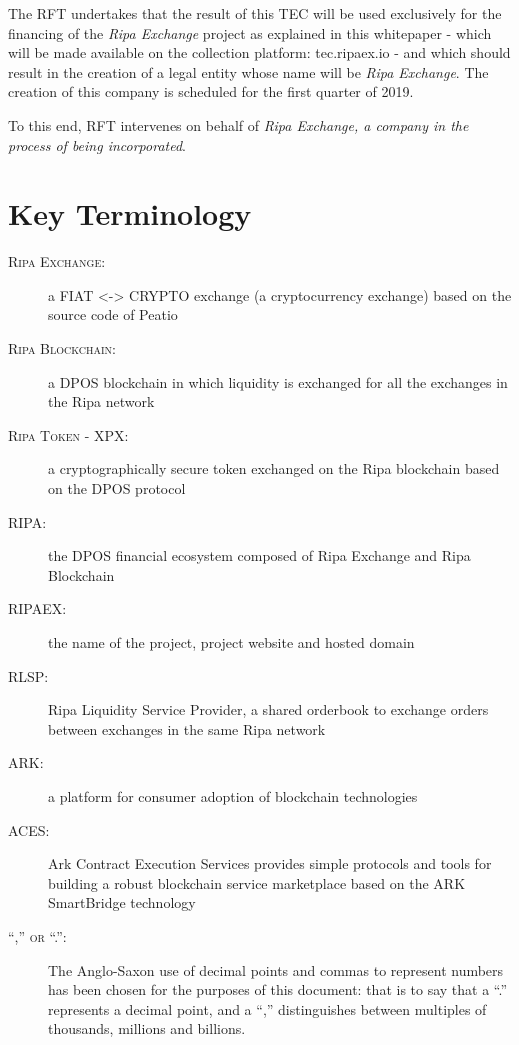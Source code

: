 \documentclass[11pt,fleqn,oneside]{book} %
\begin{document}
The RFT undertakes that the result of this TEC will be used exclusively for the financing of the \emph{Ripa Exchange} project as explained in this 
whitepaper - which will be made available on the collection platform: tec.ripaex.io - and which should result in the creation of a 
legal entity whose name will be \emph{Ripa Exchange}. The creation of this company is scheduled for the first quarter of 2019.

To this end, RFT intervenes on behalf of \emph{Ripa Exchange, a company in the process of being incorporated}.





\section{Key Terminology}
\begin{description}
	\item[\textsc{Ripa Exchange:}] a FIAT <-> CRYPTO exchange (a cryptocurrency exchange) based on the source code
	of Peatio \cite{peatio}
	\item[\textsc{Ripa Blockchain:}] a DPOS blockchain in which liquidity is exchanged for all the exchanges in the Ripa network
	\item[\textsc{Ripa Token - XPX:}] a cryptographically secure token exchanged on the Ripa blockchain based on the DPOS protocol
	\item[\textsc{RIPA:}] the DPOS financial ecosystem composed of Ripa Exchange and Ripa Blockchain
	\item[\textsc{RIPAEX:}] the name of the project, project website and hosted domain
    \item[\textsc{RLSP:}] Ripa Liquidity Service Provider, a shared orderbook to exchange orders between exchanges in the same Ripa network
	\item[\textsc{ARK:}] a platform for consumer adoption of blockchain technologies \cite{ark}
	\item[\textsc{ACES:}] Ark Contract Execution Services \cite{aces} provides simple protocols and tools for building a robust 
	blockchain service marketplace based on the ARK SmartBridge technology
    \item[\textsc{“,” or “.”:}] The Anglo-Saxon use of decimal points and commas to represent numbers has
been chosen for the purposes of this document: that is to say that a “.” represents a decimal point, and a “,”
distinguishes between multiples of thousands, millions and billions.
    \end{description}
\end{document}
